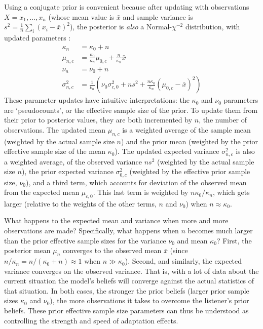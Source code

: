 Using a conjugate prior is convenient because after updating with observations $X = x_1, \ldots, x_n$ (whose mean value is $\bar x$ and sample variance is $s^2 = \frac{1}{n} \sum_i (x_i - \bar x)^2$), the posterior is \emph{also} a Normal-$\chi^{-2}$ distribution, with updated parameters \cite{Gelman2003}:
\begin{align}
  \label{eq:8}
  \kappa_n &= \kappa_0 + n \\
  \mu_{n,c} &= \frac{\kappa_0}{\kappa_n} \mu_{0,c} + \frac{n}{\kappa_n} \bar x \\
  \nu_n &= \nu_0 + n \\
  \sigma^2_{n,c} &= \frac{1}{\nu_n} ( \nu_0 \sigma^2_{c,0} + n s^2 + \frac{n \kappa_0}{\kappa_n} (\mu_{0,c} - \bar x)^2 )  \label{eq:post-sum-of-squares}
\end{align}
These parameter updates have intuitive interpretations: the $\kappa_0$ and $\nu_0$ parameters are `pseudocounts', or the effective sample size of the prior.  To update them from their prior to posterior values, they are both incremented by $n$, the number of observations.  The updated mean $\mu_{n,c}$ is a weighted average of the sample mean (weighted by the actual sample size $n$) and the prior mean (weighted by the prior effective sample size of the mean $\kappa_0$).  The updated expected variance $\sigma^2_{n,c}$ is also a weighted average, of the observed variance $n s^2$ (weighted by the actual sample size $n$), the prior expected variance $\sigma^2_{0,c}$ (weighted by the effective prior sample size, $\nu_0$), and a third term, which accounts for deviation of the observed mean from the expected mean $\mu_{c,0}$.  This last term is weighted by $n \kappa_0 / \kappa_n$, which gets larger (relative to the weights of the other terms, $n$ and $\nu_0$) when $n \approx \kappa_0$.

What happens to the expected mean and variance when more and more observations are made?  Specifically, what happens when $n$ becomes much larger than the prior effective sample sizes for the variance $\nu_0$ and mean $\kappa_0$?  First, the posterior mean $\mu_n$ converges to the observed mean $\bar x$ (since $n/\kappa_n = n/(\kappa_0+n) \approx 1$ when $n \gg \kappa_0$).  Second, and similarly, the expected variance converges on the observed variance. That is, with a lot of data about the current situation the model's beliefs will converge against the actual statistics of that situation. In both cases, the stronger the prior beliefs (larger prior sample sizes $\kappa_0$ and $\nu_0$), the more observations it takes to overcome the listener's prior beliefs.  These prior effective sample size parameters can thus be understood as controlling the strength and speed of adaptation effects.

